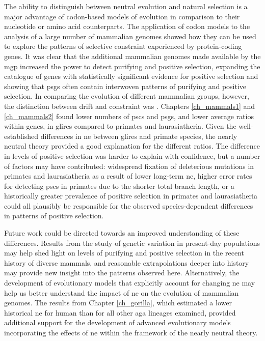 The ability to distinguish between neutral evolution and natural
selection is a major advantage of codon-based models of evolution in
comparison to their nucleotide or amino acid counterparts. The
application of codon models to the analysis of a large number of
mammalian genomes showed how they can be used to explore the patterns
of selective constraint experienced by protein-coding genes. It was
clear that the additional mammalian genomes made available by the
\acl{mgp} increased the power to detect purifying and positive
selection, expanding the catalogue of genes with statistically
significant evidence for positive selection and showing that \acp{psg}
often contain interwoven patterns of purifying and positive
selection. In comparing the evolution of different mammalian groups,
however, the distinction between drift and constraint was
. Chapters \ref{ch_mammals1} and
\ref{ch_mammals2} found lower numbers of \acp{psc} and \acp{psg}, and
lower average \dnds ratios within genes, in glires compared to
primates and laurasiatheria. Given the well-established differences in
\ac{ne} between glires and primate species, the nearly neutral theory
provided a good explanation for the different \dnds ratios. The
difference in levels of positive selection was harder to explain with
confidence, but a number of factors may have contributed: widespread
fixation of deleterious mutations in primates and laurasiatheria as a
result of lower long-term \ac{ne}, higher error rates for detecting
\acp{psc} in primates due to the shorter total branch length, or a
historically greater prevalence of positive selection in primates and
laurasiatheria could all plausibly be responsible for the observed
species-dependent differences in patterns of positive selection.

Future work could be directed towards an improved understanding of
these differences. Results from the study of genetic variation in
present-day populations may help shed light on levels of purifying and
positive selection in the recent history of diverse mammals, and
reasonable extrapolations deeper into history may provide new insight
into the patterns observed here. Alternatively, the development of
evolutionary models that explicitly account for changing \ac{ne} may
help us better understand the impact of \ac{ne} on the evolution of
mammalian genomes. The results from Chapter \ref{ch_gorilla}, which
estimated a lower historical \ac{ne} for human than for all other
\ac{aga} lineages examined, provided additional support for the
development of advanced evolutionary models incorporating the effects
of \ac{ne} within the framework of the nearly neutral theory.


